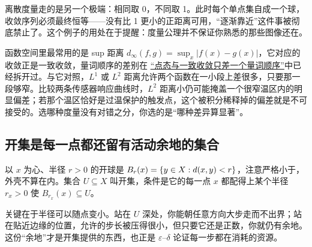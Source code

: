 离散度量走的是另一个极端：相同取 0，不同取 1。此时每个单点集自成一个球，收敛序列必须最终恒等——没有比 1 更小的正距离可用，``逐渐靠近''这件事被彻底禁止了。这个例子的用处在于提醒：度量公理并不保证你熟悉的那些图像还在。

函数空间里最常用的是 sup 距离 \(d_\infty(f,g)=\sup_x|f(x)-g(x)|\)，它对应的收敛正是一致收敛，量词顺序的差别在 \hyperref[sec:12-Real-Analysis-Support/02-Convergence/02]{``点态与一致收敛只差一个量词顺序''}中已经拆开过。与它对照，\(L^1\) 或 \(L^2\) 距离允许两个函数在一小段上差很多，只要那一段够窄。比较两条传感器响应曲线时，\(L^2\) 距离小仍可能掩盖一个很窄温区内的明显偏差；若那个温区恰好是过温保护的触发点，这个被积分稀释掉的偏差就是不可接受的。选哪种度量没有对错之分，你选的是``哪种差异算显著''。

\subsection{开集是每一点都还留有活动余地的集合}

以 \(x\) 为心、半径 \(r>0\) 的开球是 \(B_r(x)=\left\{y\in X:d(x,y)<r\right\}\)，注意严格小于，外壳不算在内。集合 \(U\subseteq X\) 叫开集，条件是它的每一点 \(x\) 都配得上某个半径 \(r_x>0\) 使 \(B_{r_x}(x)\subseteq U\)。

关键在于半径可以随点变小。站在 \(U\) 深处，你能朝任意方向大步走而不出界；站在贴近边缘的位置，允许的步长被压得很小，但只要它还是正数，你就仍有余地。这份``余地''才是开集提供的东西，也正是 \(\varepsilon\)--\(\delta\) 论证每一步都在消耗的资源。

\begin{center}
\end{center}

